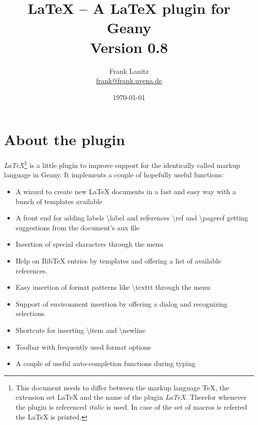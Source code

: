 \documentclass[%
paper=a4,%
fontsize=11pt,%
twoside=false,%
DIV18,%
headsepline,%
plainheadsepline,%
footsepline,%
plainfootsepline,%
bibliography=totoc,%
listof=totoc,%
BCOR10mm,%
parskip=half,%
openany,%
]{scrreprt}
\title{\LaTeX{} -- A \LaTeX{} plugin for Geany \\[1.5ex]
       \normalsize Version 0.8}
\author{Frank Lanitz \\ \small{\href{mailto:frank@frank.uvena.de}{frank@frank.uvena.de}}}
\date{\today}
\begin{document}
\dedication{\normalsize \textbf{Note:} Please note that this document has been created on
\today. If you are using a devel version from GIT, please compile and check
\texttt{doc/latex.tex} from sources. Please check Page \pageref
{sec:compiling_of_documentation}, Section \ref{sec:compiling_of_documentation} on how to do this. }


\maketitle{}
\tableofcontents{}

\newpage{}

\listoftables{}
\listoffigures{}
\lstlistoflistings{}

\newpage{}

\chapter{About the plugin}

\textit{LaTeX}\footnote{This document needs to differ between the
markup language \TeX{}, the extension set \LaTeX{} and the name of the
plugin \textit{LaTeX}. Therefor whenever the plugin is referenced
\textit{italic} is used. In case of the set of macros is referred the \LaTeX{} is printed. } is a little plugin to improve support for the
identically called markup language in Geany. It implements a couple of
hopefully useful functions:

\begin{itemize}
    \item A wizard to create new \LaTeX{} documents in a fast and easy way
          with a bunch of templates available
    \item A front end for adding labels \textbackslash label{} and
          references \textbackslash ref{} and \textbackslash pageref{}
          getting suggestions from the document's aux file
    \item Insertion of special characters through the menu
    \item Help on BibTeX entries by templates and offering a list of
          available references.
    \item Easy insertion of format patterns like \textbackslash texttt{}
          through the menu
    \item Support of environment insertion by offering a dialog and
          recognizing selections
    \item Shortcuts for inserting \textbackslash item and
          \textbackslash newline
    \item Toolbar with frequently used format options
    \item A couple of useful auto-completion functions during typing
\end{itemize}
\end{document}
